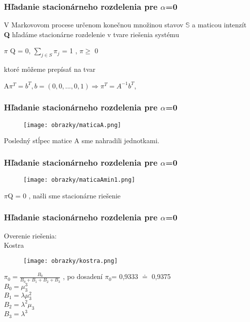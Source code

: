 \documentclass[hyperref={pdfpagelabels=false}]{beamer}
\begin{document}
\begin{frame}
\frametitle{Hľadanie stacionárneho rozdelenia  pre $\alpha$=0}
V Markovovom procese určenom konečnou množinou stavov $\mathbb{S}$ a maticou intenzít {\bf Q} hľadáme stacionárne rozdelenie v tvare riešenia systému\\
\begin{center}
$\pi$ Q = 0, $\sum\limits_{j \in S}{} \pi_j$ = 1 , $\pi \geq$ 0\\
\end{center}
ktoré môžeme prepísať na tvar\\
\begin{center}
A$\pi^T = b^T, b = (0,0,...,0,1) \Rightarrow \pi^T = A^{-1} b^T$,
\end{center}
\end{frame}


\begin{frame}
\frametitle{Hľadanie stacionárneho rozdelenia  pre $\alpha$=0}
\begin{figure}[!hlrbt]
\begin{center}
\texttt{[image: obrazky/maticaA.png]}
\end{center}
\end{figure}
Posledný stĺpec matice A sme nahradili jednotkami.
\end{frame}

\begin{frame}
\frametitle{Hľadanie stacionárneho rozdelenia  pre $\alpha$=0}
\begin{figure}[!hlrbt]
\begin{center}
\texttt{[image: obrazky/maticaAmin1.png]}
\end{center}
\end{figure}
$\pi$Q = 0 , našli sme stacionárne riešenie
\end{frame}


\begin{frame}
\frametitle{Hľadanie stacionárneho rozdelenia  pre $\alpha$=0}
Overenie riešenia:\\
Kostra\\

\begin{figure}[!hlrbt]
\begin{center}
\texttt{[image: obrazky/kostra.png]}
\end{center}
\end{figure}
$\pi_0=\frac{B_0}{B_0+B_1+B_2+B_3}$ , po dosadení $\pi_0$= 0,9333 $\doteq$ 0,9375 \\
$B_0=\mu_3^3$\\
$B_1=\lambda\mu_3^2$\\
$B_2=\lambda^2\mu_3$\\
$B_3=\lambda^3$
\end{frame}
\end{document}
